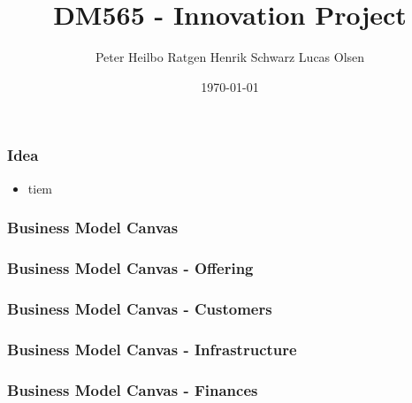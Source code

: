 \documentclass{beamer}
\title{DM565 - Innovation Project}
\author{Peter Heilbo Ratgen Henrik Schwarz Lucas Olsen}
\date{\today}
\begin{document}
\frame{\titlepage}

\begin{frame}
  \frametitle{Idea}
  \begin{itemize}
    \item tiem
  \end{itemize}
\end{frame}
\begin{frame}
  \frametitle{Business Model Canvas}
\end{frame}
\begin{frame}
  \frametitle{Business Model Canvas - Offering}
\end{frame}
\begin{frame}
  \frametitle{Business Model Canvas - Customers}
\end{frame}
\begin{frame}
  \frametitle{Business Model Canvas - Infrastructure}
\end{frame}
\begin{frame}
  \frametitle{Business Model Canvas - Finances}
\end{frame}
\end{document}
